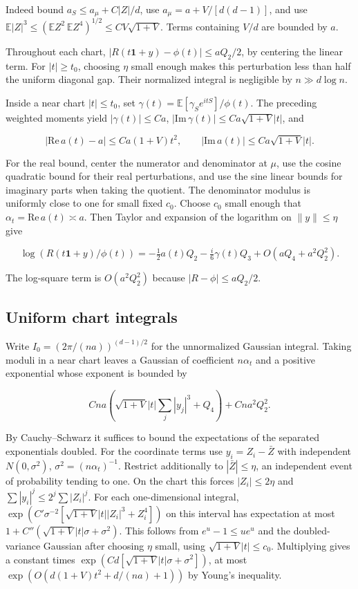 Indeed bound $a_S\le a_\mu+C|Z|/d$, use $a_\mu=a+V/[d(d-1)]$, and use $\mathbb E|Z|^3\le(\mathbb EZ^2\,\mathbb EZ^4)^{1/2}\le C V\sqrt{1+V}$. Terms containing $V/d$ are bounded by $a$.

Throughout each chart, $|R(t\mathbf1+y)-\phi(t)|\le aQ_2/2$, by centering the linear term. For $|t|\ge t_0$, choosing $\eta$ small enough makes this perturbation less than half the uniform diagonal gap. Their normalized integral is negligible by $n\gg d\log n$.

Inside a near chart $|t|\le t_0$, set $\gamma(t)=\mathbb E[\gamma_S e^{itS}]/\phi(t)$. The preceding weighted moments yield $|\gamma(t)|\le Ca$, $|\mathrm{Im}\,\gamma(t)|\le Ca\sqrt{1+V}|t|$, and

\begin{equation*}
|\mathrm{Re}\,a(t)-a|\le Ca(1+V)t^2,\qquad |\mathrm{Im}\,a(t)|\le Ca\sqrt{1+V}|t|.
\end{equation*}

For the real bound, center the numerator and denominator at $\mu$, use the cosine quadratic bound for their real perturbations, and use the sine linear bounds for imaginary parts when taking the quotient. The denominator modulus is uniformly close to one for small fixed $c_0$. Choose $c_0$ small enough that $\alpha_t=\mathrm{Re}\,a(t)\asymp a$. Then Taylor and expansion of the logarithm on $\|y\|\le\eta$ give

\begin{equation*}
\log(R(t\mathbf1+y)/\phi(t))
=-\tfrac12a(t)Q_2-\tfrac i6\gamma(t)Q_3+O(aQ_4+a^2Q_2^2).
\end{equation*}

The log-square term is $O(a^2 Q_2^2)$ because $|R-\phi|\le aQ_2/2$.

\subsection{Uniform chart integrals}

Write $I_0=(2\pi/(na))^{(d-1)/2}$ for the unnormalized Gaussian integral. Taking moduli in a near chart leaves a Gaussian of coefficient $n\alpha_t$ and a positive exponential whose exponent is bounded by

\begin{equation*}
Cna\left(\sqrt{1+V}|t|\sum_j|y_j|^3+Q_4\right)+Cna^2Q_2^2.
\end{equation*}

By Cauchy--Schwarz it suffices to bound the expectations of the separated exponentials doubled. For the coordinate terms use $y_i=Z_i-\bar Z$ with independent $N(0,\sigma^2)$, $\sigma^2=(n\alpha_t)^{-1}$. Restrict additionally to $|\bar Z|\le\eta$, an independent event of probability tending to one. On the chart this forces $|Z_i|\le2\eta$ and $\sum|y_i|^j\le2^j\sum|Z_i|^j$. For each one-dimensional integral, $\exp(C'\sigma^{-2}[\sqrt{1+V}|t||Z_i|^3+Z_i^4])$ on this interval has expectation at most $1+C''(\sqrt{1+V}|t|\sigma+\sigma^2)$. This follows from $e^u-1\le u e^u$ and the doubled-variance Gaussian after choosing $\eta$ small, using $\sqrt{1+V}|t|\le c_0$. Multiplying gives a constant times $\exp(Cd[\sqrt{1+V}|t|\sigma+\sigma^2])$, at most $\exp(O(d(1+V)t^2+d/(na)+1))$ by Young's inequality.

